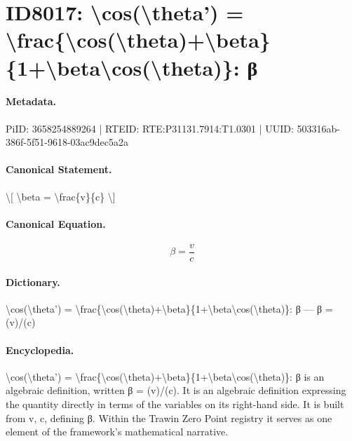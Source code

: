 \section*{ID8017: \textbackslash{}cos(\textbackslash{}theta') = \textbackslash{}frac\{\textbackslash{}cos(\textbackslash{}theta)+\textbackslash{}beta\}\{1+\textbackslash{}beta\textbackslash{}cos(\textbackslash{}theta)\}: β}
\paragraph{Metadata.}
PiID: 3658254889264 | RTEID: RTE:P31131.7914:T1.0301 | UUID: 503316ab-386f-5f51-9618-03ac9dec5a2a

\paragraph{Canonical Statement.}
\textbackslash{}[ \textbackslash{}beta = \textbackslash{}frac\{v\}\{c\} \textbackslash{}]

\paragraph{Canonical Equation.}
\[
\beta = \frac{v}{c}
\]

\paragraph{Dictionary.}
\textbackslash{}cos(\textbackslash{}theta') = \textbackslash{}frac\{\textbackslash{}cos(\textbackslash{}theta)+\textbackslash{}beta\}\{1+\textbackslash{}beta\textbackslash{}cos(\textbackslash{}theta)\}: β — β = (v)/(c)

\paragraph{Encyclopedia.}
\textbackslash{}cos(\textbackslash{}theta') = \textbackslash{}frac\{\textbackslash{}cos(\textbackslash{}theta)+\textbackslash{}beta\}\{1+\textbackslash{}beta\textbackslash{}cos(\textbackslash{}theta)\}: β is an algebraic definition, written β = (v)/(c). It is an algebraic definition expressing the quantity directly in terms of the variables on its right-hand side. It is built from v, c, defining β. Within the Trawin Zero Point registry it serves as one element of the framework's mathematical narrative.
